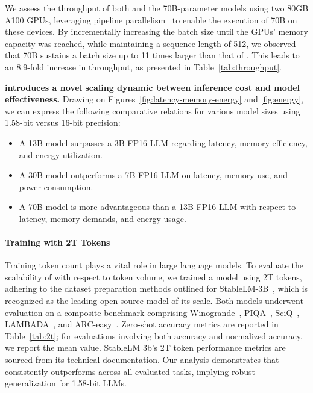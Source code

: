 We assess the throughput of both  and the 70B-parameter  models using two 80GB A100 GPUs, leveraging pipeline parallelism~\cite{gpipe} to enable the execution of  70B on these devices. By incrementally increasing the batch size until the GPUs’ memory capacity was reached, while maintaining a sequence length of 512, we observed that  70B sustains a batch size up to 11 times larger than that of . This leads to an 8.9-fold increase in throughput, as presented in Table~\ref{tab:throughput}.

\textbf{ introduces a novel scaling dynamic between inference cost and model effectiveness.} Drawing on Figures~\ref{fig:latency-memory-energy} and \ref{fig:energy}, we can express the following comparative relations for various model sizes using 1.58-bit versus 16-bit precision:

\begin{itemize}
    \item A 13B  model surpasses a 3B FP16 LLM regarding latency, memory efficiency, and energy utilization.
    \item A 30B  model outperforms a 7B FP16 LLM on latency, memory use, and power consumption.
    \item A 70B  model is more advantageous than a 13B FP16 LLM with respect to latency, memory demands, and energy usage.
\end{itemize}

\paragraph{Training with 2T Tokens}

Training token count plays a vital role in large language models. To evaluate the scalability of  with respect to token volume, we trained a  model using 2T tokens, adhering to the dataset preparation methods outlined for StableLM-3B~\cite{StableLM-3B-4E1T}, which is recognized as the leading open-source model of its scale. Both models underwent evaluation on a composite benchmark comprising Winogrande~\cite{winoGrande}, PIQA~\cite{piqa}, SciQ~\cite{sciq}, LAMBADA~\cite{lambada}, and ARC-easy~\cite{arc}. Zero-shot accuracy metrics are reported in Table~\ref{tab:2t}; for evaluations involving both accuracy and normalized accuracy, we report the mean value. StableLM 3b's 2T token performance metrics are sourced from its technical documentation. Our analysis demonstrates that  consistently outperforms across all evaluated tasks, implying robust generalization for 1.58-bit LLMs.

